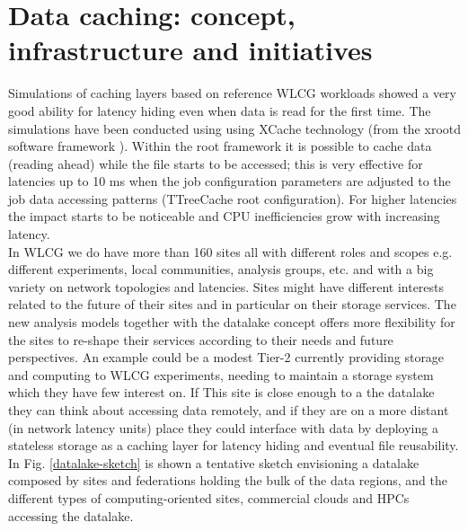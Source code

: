 \section{Data caching: concept, infrastructure and initiatives}
Simulations of caching layers based on reference WLCG workloads showed a very good ability for latency hiding even when data is read for the first time. The simulations have been conducted using using XCache technology (from the xrootd software framework \cite{xroot}).
Within the root framework \cite{root} it is possible to cache data (reading ahead) while the file starts to be accessed; this is very effective for latencies up to 10 ms when the job configuration parameters are adjusted to the job data accessing patterns (TTreeCache root configuration). For higher latencies the impact starts to be noticeable and CPU inefficiencies grow with increasing latency.\\
In WLCG we do have more than 160 sites all with different roles and scopes e.g. different experiments, local communities, analysis groups, etc. and with a big variety on network topologies and latencies. Sites might have different interests related to the future of their sites and in particular on their storage services. The new analysis models together with the datalake concept offers more flexibility for the sites to re-shape their services according to their needs and future perspectives. An example could be a modest Tier-2 currently providing storage and computing to WLCG experiments, needing to maintain a storage system which they have few interest on. If This site is close enough to a the datalake they can think about accessing data remotely, and if they are on a more distant (in network latency units) place they could interface with data by deploying a stateless storage as a caching layer for latency hiding and eventual file reusability. In Fig. \ref{datalake-sketch} is shown a tentative sketch envisioning a datalake composed by sites and federations holding the bulk of the data regions, and the different types of computing-oriented sites, commercial clouds and HPCs accessing the datalake.\\

